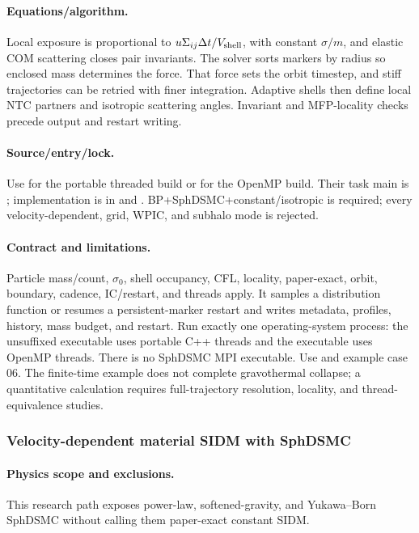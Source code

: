 \paragraph{Equations/algorithm.}
Local exposure is proportional to \(u\Sigma_{ij}\Delta t/V_{\rm shell}\),
with constant \(\sigma/m\), and elastic COM scattering closes pair invariants.
The solver sorts markers by radius so enclosed mass determines the force.
That force sets the orbit timestep, and stiff trajectories can be retried
with finer integration. Adaptive shells then define local NTC partners and
isotropic scattering angles. Invariant and MFP-locality checks precede output
and restart writing.
\paragraph{Source/entry/lock.}
Use  for the portable threaded build or
 for the OpenMP build.  Their
task main is ; implementation is in
 and
.  BP+SphDSMC+constant/isotropic is
required; every velocity-dependent, grid, WPIC, and subhalo mode is rejected.
\paragraph{Contract and limitations.}
Particle mass/count, \(\sigma_0\), shell occupancy, CFL, locality,
paper-exact, orbit, boundary, cadence, IC/restart, and threads apply.  It
samples a distribution function or resumes a persistent-marker restart and writes metadata,
profiles, history, mass budget, and restart.  Run exactly one operating-system
process: the unsuffixed executable uses portable C++ threads and the
 executable uses OpenMP threads.  There is no SphDSMC MPI
executable.
Use  and example case 06.  The
finite-time example does not complete gravothermal collapse; a quantitative
calculation requires full-trajectory resolution, locality, and
thread-equivalence studies.

\subsubsection{Velocity-dependent material SIDM with SphDSMC}
\paragraph{Physics scope and exclusions.}
This research path exposes power-law, softened-gravity, and Yukawa--Born
SphDSMC without calling them paper-exact constant SIDM.
